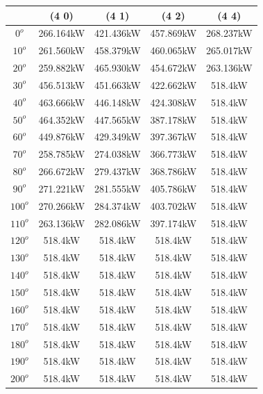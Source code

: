         \begin{table}[H]
        	\centering
        	\begin{tabular}{|c|c|c|c|c|} \hline
        			& (4 0)		& (4 1)		& (4 2)		& (4 4)		\\ \hline
        		$0^o$	& 266.164kW	& 421.436kW	& 457.869kW	& 268.237kW	\\ \hline
        		$10^o$	& 261.560kW	& 458.379kW	& 460.065kW	& 265.017kW	\\ \hline
        		$20^o$	& 259.882kW	& 465.930kW	& 454.672kW	& 263.136kW	\\ \hline
        		$30^o$	& 456.513kW	& 451.663kW	& 422.662kW	& 518.4kW	\\ \hline
        		$40^o$	& 463.666kW	& 446.148kW	& 424.308kW	& 518.4kW	\\ \hline
        		$50^o$	& 464.352kW	& 447.565kW	& 387.178kW	& 518.4kW	\\ \hline
        		$60^o$	& 449.876kW	& 429.349kW	& 397.367kW	& 518.4kW	\\ \hline
        		$70^o$	& 258.785kW	& 274.038kW	& 366.773kW	& 518.4kW	\\ \hline
        		$80^o$	& 266.672kW	& 279.437kW	& 368.786kW	& 518.4kW	\\ \hline
        		$90^o$	& 271.221kW	& 281.555kW	& 405.786kW	& 518.4kW	\\ \hline
        		$100^o$	& 270.266kW	& 284.374kW	& 403.702kW	& 518.4kW	\\ \hline
        		$110^o$	& 263.136kW	& 282.086kW	& 397.174kW	& 518.4kW	\\ \hline
        		$120^o$	& 518.4kW	& 518.4kW	& 518.4kW	& 518.4kW	\\ \hline
        		$130^o$ & 518.4kW	& 518.4kW	& 518.4kW	& 518.4kW	\\ \hline
        		$140^o$	& 518.4kW	& 518.4kW	& 518.4kW	& 518.4kW	\\ \hline
        		$150^o$	& 518.4kW	& 518.4kW	& 518.4kW	& 518.4kW	\\ \hline
        		$160^o$ & 518.4kW	& 518.4kW	& 518.4kW	& 518.4kW	\\ \hline
        		$170^o$	& 518.4kW	& 518.4kW	& 518.4kW	& 518.4kW	\\ \hline
        		$180^o$	& 518.4kW	& 518.4kW	& 518.4kW	& 518.4kW	\\ \hline
        		$190^o$	& 518.4kW	& 518.4kW	& 518.4kW	& 518.4kW	\\ \hline
        		$200^o$	& 518.4kW	& 518.4kW	& 518.4kW	& 518.4kW	\\ \hline

\end{tabular}
\end{table}
